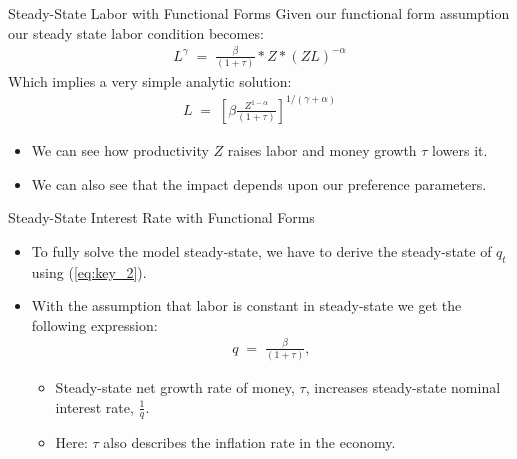 \documentclass[10pt,c,aspectratio=1610,handout]{beamer}
\begin{document}
\begin{frame}{Steady-State Labor with Functional Forms}%
  Given our functional form assumption our steady state labor condition becomes:%
  \begin{align*}%
    L^{\gamma} \; = \; \frac{\beta}{(1+\tau)} \ast Z \ast (Z L)^{-\alpha}%
  \end{align*}%
  Which implies a very simple analytic solution:%
  \begin{align*}%
    L \; = \; \left[ \beta \frac{Z^{1-\alpha}}{(1+\tau)}\right]^{1/(\gamma+\alpha)}%
  \end{align*}%
  \pause%
  \begin{itemize}%
    \item[$\blacktriangleright$] We can see how productivity $Z$ raises labor and money growth $\tau$ lowers it.%
    \item[$\blacktriangleright$] We can also see that the impact depends upon our preference parameters.%
  \end{itemize}%
\end{frame}%
\begin{frame}{Steady-State Interest Rate with Functional Forms}%
  \begin{itemize}%
    \item[$\blacktriangleright$] To fully solve the model steady-state, we have to derive the steady-state of $q_t$ using (\ref{eq:key_2}).
    \item[$\blacktriangleright$] With the assumption that labor is constant in steady-state we get the following expression:%
    \begin{align*}
      q \; = \; \frac{\beta}{(1+\tau)},%
    \end{align*}
    \begin{itemize}%
      \item[$\rightarrow$] Steady-state net growth rate of money, $\tau$, increases steady-state nominal interest rate, $\frac{1}{q}$.%
      \item[$\rightarrow$] Here: $\tau$ also describes the inflation rate in the economy.%
    \end{itemize}%
  \end{itemize}%
\end{frame}%
\end{document}
